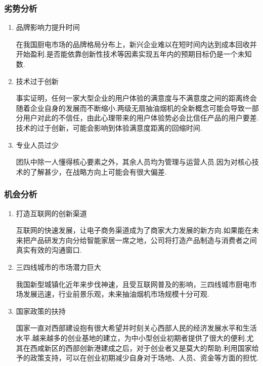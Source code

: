 \subsubsection{劣势分析}
\begin{enumerate}
\item 品牌影响力提升时间

      在我国厨电市场的品牌格局分布上，新兴企业难以在短时间内达到成本回收并开始盈利.是否能依靠创新性技术等因素实现五年内的预期目标仍是一个未知数.

\item 技术过于创新

      事实证明，任何一家大型企业的用户体验的满意度与不满意度之间的距离终会随着企业自身的发展而不断缩小.两级无扇抽油烟机的全新概念可能会导致一部分用户对此的不信任，由此心理带来的用户体验势必会比信任产品的用户要差.技术的过于创新，可能会影响到体验满意度距离的回缩时间.

\item 专业人员过少

      团队中除一人懂得核心要素之外，其余人员均为管理与运营人员.因为对核心技术的了解甚少，在战略方向上可能会有很大偏差.
\end{enumerate}

\subsubsection{机会分析}
\begin{enumerate}
\item 打造互联网的创新渠道

      互联网的快速发展，让电子商务渠道成为了商家大力发展的新方向.如果能在未来把产品研发方向分给智能家居一席之地，公司将打造产品制造与消费者之间真实有效的沟通窗口.

\item 三四线城市的市场潜力巨大

      我国新型城镇化近年来步伐神速，且受互联网普及的影响，三四线城市厨电市场发展迅速，行业前景乐观，未来抽油烟机市场规模十分可观.

\item 国家政策的扶持

      国家一直对西部建设抱有很大希望并时刻关心西部人民的经济发展水平和生活水平.越来越多的创业基地的建立，为中小型创业初期者提供了很大的便利.尤其在西咸新区的西部创新港建成之后，对于创业者又是莫大的帮助.利用国家给予的政策支持，可以在创业初期减少自身对于场地、人员、资金等方面的担忧.
\end{enumerate}


